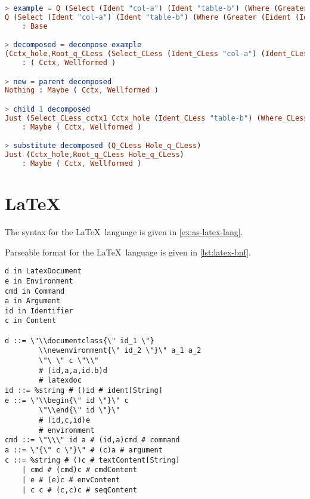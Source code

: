 \begin{minipage}{\textwidth}
    \begin{lstlisting}[style=inline, language=elm, caption={Elm REPL demonstration of the SQL editor}, label={lst:SQL-repl}]
> example = Q (Select (Ident "col-a") (Ident "table-b") (Where (Greater (Eident (Ident "col-a")) (Econst (Num 2)))))
Q (Select (Ident "col-a") (Ident "table-b") (Where (Greater (Eident (Ident "col-a")) (Econst (Num 2)))))
    : Base

> decomposed = decompose example
(Cctx_hole,Root_q_CLess (Select_CLess (Ident_CLess "col-a") (Ident_CLess "table-b") (Where_CLess (Greater_CLess (Eident_CLess (Ident_CLess "col-a")) (Econst_CLess (Num_CLess 2))))))
    : ( Cctx, Wellformed )

> new = parent decomposed
Nothing : Maybe ( Cctx, Wellformed )

> child 1 decomposed
Just (Select_CLess_cctx1 Cctx_hole (Ident_CLess "table-b") (Where_CLess (Greater_CLess (Eident_CLess (Ident_CLess "col-a")) (Econst_CLess (Num_CLess 2)))),Root_id_CLess (Ident_CLess "col-a"))
    : Maybe ( Cctx, Wellformed )

> substitute decomposed (Q_CLess Hole_q_CLess)
Just (Cctx_hole,Root_q_CLess Hole_q_CLess)
    : Maybe ( Cctx, Wellformed )
\end{lstlisting}
\end{minipage}

\newpage

\section{\LaTeX}

The syntax for the \LaTeX \ language is given in \cref{ex:as-latex-lang}.

Parseable format for the \LaTeX \ language is given in \cref{lst:latex-bnf}.


\begin{minipage}{\textwidth}
    \begin{lstlisting}[style=inline, caption={Parseable format of \LaTeX \ language syntax}, label={lst:latex-bnf}]
d in LatexDocument
e in Environment
cmd in Command
a in Argument
id in Identifier
c in Content

d ::= \"\\documentclass{\" id_1 \"}
        \\newenvironment{\" id_2 \"}\" a_1 a_2 
        \"\ \" c \"\\" 
        # (id,a,a,id.b)d 
        # latexdoc
id ::= %string # ()id # ident[String]
e ::= \"\\begin{\" id \"}\" c 
        \"\\end{\" id \"}\" 
        # (id,c,id)e 
        # environment
cmd ::= \"\\\" id a # (id,a)cmd # command
a ::= \"{\" c \"}\" # (c)a # argument
c ::= %string # ()c # textContent[String] 
    | cmd # (cmd)c # cmdContent 
    | e # (e)c # envContent 
    | c c # (c,c)c # seqContent
    
    
\end{lstlisting}
\end{minipage}

